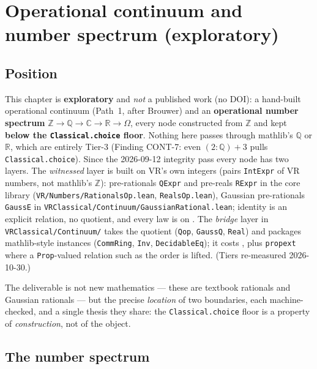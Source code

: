 \chapter{Operational continuum and number spectrum (exploratory)}
\label{chap:continuum}

\section{Position}
\label{sec:continuum_position}

This chapter is \textbf{exploratory} and \emph{not} a published work (no DOI): a
hand-built operational continuum (Path~1, after Brouwer) and an \textbf{operational
number spectrum} $\mathbb{Z} \to \mathbb{Q} \to \mathbb{C} \to \mathbb{R} \to \Omega$,
every node constructed from $\mathbb{Z}$ and kept \textbf{below the
\texttt{Classical.choice} floor}.  Nothing here passes through mathlib's $\mathbb{Q}$
or $\mathbb{R}$, which are entirely Tier-3 (Finding CONT-7: even $(2:\mathbb{Q})+3$
pulls \texttt{Classical.choice}).  Since the 2026-09-12 integrity pass every node has
two layers.  The \emph{witnessed} layer is built on VR's own integers (pairs
\texttt{IntExpr} of VR numbers, not mathlib's $\mathbb{Z}$): pre-rationals
\texttt{QExpr} and pre-reals \texttt{RExpr} in the core library
(\texttt{VR/Numbers/RationalsOp.lean}, \texttt{RealsOp.lean}), Gaussian pre-rationals
\texttt{GaussE} in \texttt{VRClassical/Continuum/GaussianRational.lean}; identity is an
explicit relation, no quotient, and every law is on \axiomprofile{[]}.  The
\emph{bridge} layer in \texttt{VRClassical/Continuum/} takes the quotient
(\texttt{Qop}, \texttt{GaussQ}, \texttt{Real}) and packages mathlib-style instances
(\texttt{CommRing}, \texttt{Inv}, \texttt{DecidableEq}); it costs
, plus \texttt{propext} where a \texttt{Prop}-valued relation
such as the order is lifted.  (Tiers re-measured 2026-10-30.)

The deliverable is not new mathematics --- these are textbook rationals and Gaussian
rationals --- but the precise \emph{location} of two boundaries, each machine-checked,
and a single thesis they share: the \texttt{Classical.choice} floor is a property of
\emph{construction}, not of the object.

\section{The number spectrum}
\label{sec:continuum_spectrum}


